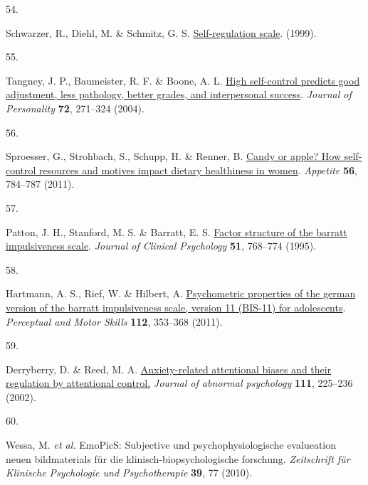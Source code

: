 \documentclass[
  man,floatsintext]{apa6}
\newlength{\cslhangindent}
\newlength{\csllabelwidth}
\newlength{\cslentryspacingunit} %
\newenvironment{CSLReferences}[2] %
 {%
  \setlength{\parindent}{0pt}
  \ifodd #1
  \let\oldpar\par
  \def\par{\hangindent=\cslhangindent\oldpar}
  \fi
  \setlength{\parskip}{#2\cslentryspacingunit}
 }%
 {}
\newcommand{\CSLLeftMargin}[1]{\parbox[t]{\csllabelwidth}{#1}}
\newcommand{\CSLRightInline}[1]{\parbox[t]{\linewidth - \csllabelwidth}{#1}\break}
\begin{document}
\begin{CSLReferences}{0}{0}
\leavevmode{}%
\CSLLeftMargin{54. }%
\CSLRightInline{Schwarzer, R., Diehl, M. \& Schmitz, G. S. \href{http://userpage.fu-berlin.de/~health/selfreg_g.htm}{Self-regulation scale}. (1999).}

\leavevmode{}%
\CSLLeftMargin{55. }%
\CSLRightInline{Tangney, J. P., Baumeister, R. F. \& Boone, A. L. \href{https://doi.org/10.1111/j.0022-3506.2004.00263.x}{High self-control predicts good adjustment, less pathology, better grades, and interpersonal success}. \emph{Journal of Personality} \textbf{72}, 271--324 (2004).}

\leavevmode{}%
\CSLLeftMargin{56. }%
\CSLRightInline{Sproesser, G., Strohbach, S., Schupp, H. \& Renner, B. \href{https://doi.org/10.1016/j.appet.2011.01.028}{Candy or apple? How self-control resources and motives impact dietary healthiness in women}. \emph{Appetite} \textbf{56}, 784--787 (2011).}

\leavevmode{}%
\CSLLeftMargin{57. }%
\CSLRightInline{Patton, J. H., Stanford, M. S. \& Barratt, E. S. \href{https://doi.org/10.1002/1097-4679(199511)51:6\%3C768::aid-jclp2270510607\%3E3.0.co;2-1}{Factor structure of the barratt impulsiveness scale}. \emph{Journal of Clinical Psychology} \textbf{51}, 768--774 (1995).}

\leavevmode{}%
\CSLLeftMargin{58. }%
\CSLRightInline{Hartmann, A. S., Rief, W. \& Hilbert, A. \href{https://doi.org/10.2466/08.09.10.PMS.112.2.353-368}{Psychometric properties of the german version of the barratt impulsiveness scale, version 11 (BIS-11) for adolescents}. \emph{Perceptual and Motor Skills} \textbf{112}, 353--368 (2011).}

\leavevmode{}%
\CSLLeftMargin{59. }%
\CSLRightInline{Derryberry, D. \& Reed, M. A. \href{https://doi.org/10.1037//0021-843X.111.2.225}{Anxiety-related attentional biases and their regulation by attentional control.} \emph{Journal of abnormal psychology} \textbf{111}, 225--236 (2002).}

\leavevmode{}%
\CSLLeftMargin{60. }%
\CSLRightInline{Wessa, M. \emph{et al.} EmoPicS: Subjective und psychophysiologische evalueation neuen bildmaterials für die klinisch-biopsychologische forschung. \emph{Zeitschrift für Klinische Psychologie und Psychotherapie} \textbf{39}, 77 (2010).}


\end{CSLReferences}
\end{document}
